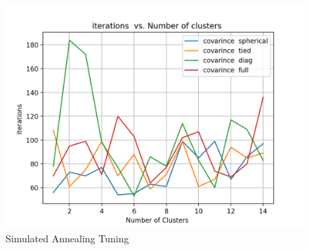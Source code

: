 \documentclass[a4paper,12pt]{article}
\begin{document}
\begin{figure}[!htb]
\begin{minipage}{0.25\textwidth}
   \end{minipage}\hfill
    \begin{minipage}{0.25\textwidth}
     \centering
     \includegraphics[width=.95\linewidth]{em_iter_nn_5}
   \end{minipage}\hfill
 \caption { Simulated Annealing Tuning}
\end{figure}
\end{document}
